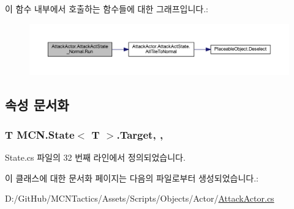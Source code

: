 이 함수 내부에서 호출하는 함수들에 대한 그래프입니다.\+:
\nopagebreak
\begin{figure}[H]
\begin{center}
\leavevmode
\includegraphics[width=350pt]{class_attack_actor_1_1_attack_act_state___normal_a7d6644fed269325b8f62138d8adb50f5_cgraph}
\end{center}
\end{figure}




\subsection{속성 문서화}
\subsubsection[{\texorpdfstring{Target}{Target}}]{\setlength{\rightskip}{0pt plus 5cm}T {\bf M\+C\+N.\+State}$<$ T $>$.Target\hspace{0.3cm}{\ttfamily [get]}, {\ttfamily [protected]}, {\ttfamily [inherited]}}\hypertarget{class_m_c_n_1_1_state_a93ba2fd920292031bd6e65b1dc505cb3}{}\label{class_m_c_n_1_1_state_a93ba2fd920292031bd6e65b1dc505cb3}


State.\+cs 파일의 32 번째 라인에서 정의되었습니다.



이 클래스에 대한 문서화 페이지는 다음의 파일로부터 생성되었습니다.\+:\begin{DoxyCompactItemize}
\item 
D\+:/\+Git\+Hub/\+M\+C\+N\+Tactics/\+Assets/\+Scripts/\+Objects/\+Actor/\hyperlink{_attack_actor_8cs}{Attack\+Actor.\+cs}\end{DoxyCompactItemize}

